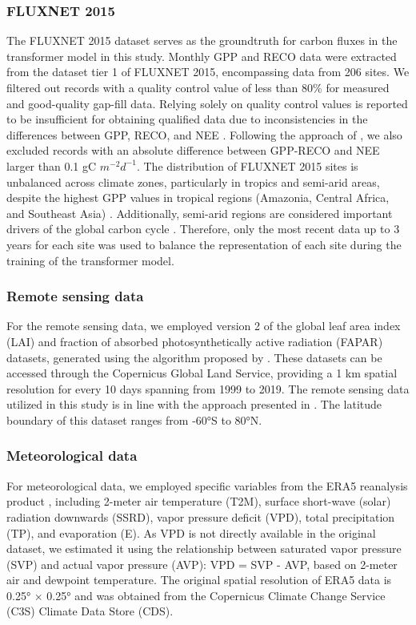 \subsubsection*{FLUXNET 2015}
The FLUXNET 2015 dataset \citep{pastorello2020fluxnet2015} serves as the groundtruth for carbon fluxes in the transformer model in this study. Monthly GPP and RECO data were extracted from the dataset tier 1 of FLUXNET 2015, encompassing data from 206 sites. We filtered out records with a quality control value of less than 80\% for measured and good-quality gap-fill data. Relying solely on quality control values is reported to be insufficient for obtaining qualified data due to inconsistencies in the differences between GPP, RECO, and NEE \citep{zeng2020global, tramontana2016predicting}. Following the approach of \citep{zeng2020global}, we also excluded records with an absolute difference between GPP-RECO and NEE larger than 0.1 gC $m^{-2} d^{-1}$. The distribution of FLUXNET 2015 sites is unbalanced across climate zones, particularly in tropics and semi-arid areas, despite the highest GPP values in tropical regions (Amazonia, Central Africa, and Southeast Asia) \citep{chen2017regional}. Additionally, semi-arid regions are considered important drivers of the global carbon cycle \citep{poulter2014contribution}. Therefore, only the most recent data up to 3 years for each site was used to balance the representation of each site during the training of the transformer model. \par
\subsubsection*{Remote sensing data}
For the remote sensing data, we employed version 2 of the global leaf area index (LAI) and fraction of absorbed photosynthetically active radiation (FAPAR) datasets, generated using the algorithm proposed by \citep{verger2014near}. These datasets can be accessed through the Copernicus Global Land Service, providing a 1 km spatial resolution for every 10 days spanning from 1999 to 2019. The remote sensing data utilized in this study is in line with the approach presented in \citep{zeng2020global}. The latitude boundary of this dataset ranges from -60°S to 80°N. \par
\subsubsection*{Meteorological data}
For meteorological data, we employed specific variables from the ERA5 reanalysis product \citep{hersbach2020era5}, including 2-meter air temperature (T2M), surface short-wave (solar) radiation downwards (SSRD), vapor pressure deficit (VPD), total precipitation (TP), and evaporation (E). As VPD is not directly available in the original dataset, we estimated it using the relationship between saturated vapor pressure (SVP) and actual vapor pressure (AVP): VPD = SVP - AVP, based on 2-meter air and dewpoint temperature. The original spatial resolution of ERA5 data is 0.25° × 0.25° and was obtained from the Copernicus Climate Change Service (C3S) Climate Data Store (CDS). \par

